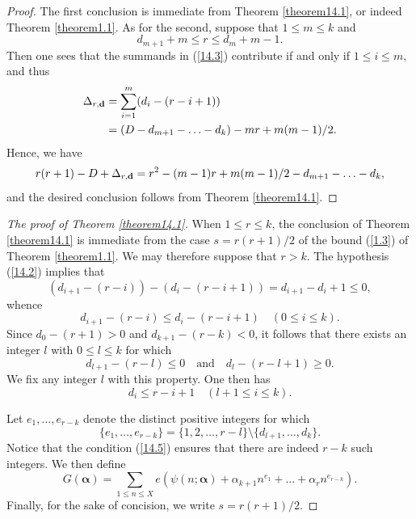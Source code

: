 \documentclass[12pt,reqno]{amsart}
\theoremstyle{definition}
\theoremstyle{remark}
\numberwithin{equation}{section}
\def\bfd{{\mathbf d}} \def\bfe{{\mathbf e}} \def\bff{{\mathbf f}}
\def\alp{{\alpha}} \def\bfalp{{\boldsymbol \alpha}}
\def\le{\leqslant} \def\ge{\geqslant} \def\pleq{\preccurlyeq} \def\ple{\prec}
\begin{document}
\begin{proof} The first conclusion is immediate from Theorem \ref{theorem14.1}, or 
indeed Theorem \ref{theorem1.1}. As for the second, suppose that $1\le m\le k$ and
$$d_{m+1}+m\le r\le d_m+m-1.$$
Then one sees that the summands in (\ref{14.3}) contribute if and only if $1\le i\le m$, and 
thus
\begin{align*}
\Del_{r,\bfd}&=\sum_{i=1}^m(d_i-(r-i+1))\\
&=(D-d_{m+1}-\ldots -d_k)-mr+m(m-1)/2.
\end{align*}
Hence, we have
$$r(r+1)-D+\Del_{r,\bfd}=r^2-(m-1)r+m(m-1)/2-d_{m+1}-\ldots -d_k,$$
and the desired conclusion follows from Theorem \ref{theorem14.1}.
\end{proof}

\begin{proof}[The proof of Theorem \ref{theorem14.1}] When $1\le r\le k$, the conclusion 
of Theorem \ref{theorem14.1} is immediate from the case $s=r(r+1)/2$ of the bound 
(\ref{1.3}) of Theorem \ref{theorem1.1}. We may therefore suppose that $r>k$. The 
hypothesis (\ref{14.2}) implies that
$$(d_{i+1}-(r-i))-(d_i-(r-i+1))=d_{i+1}-d_i+1\le 0,$$
whence
$$d_{i+1}-(r-i)\le d_i-(r-i+1)\quad (0\le i\le k).$$
Since $d_0-(r+1)>0$ and $d_{k+1}-(r-k)<0$, it follows that there exists an integer $l$ with 
$0\le l\le k$ for which
$$d_{l+1}-(r-l)\le 0\quad \text{and}\quad d_l-(r-l+1)\ge 0.$$
We fix any integer $l$ with this property. One then has
\begin{equation}\label{14.5}
d_i\le r-i+1\quad (l+1\le i\le k).
\end{equation}

Let $e_1,\ldots ,e_{r-k}$ denote the distinct positive integers for which
$$\{e_1,\ldots ,e_{r-k}\}=\{1,2,\ldots ,r-l\}\setminus \{d_{l+1},\ldots ,d_k\}.$$
Notice that the condition (\ref{14.5}) ensures that there are indeed $r-k$ such integers. 
We then define
$$G(\bfalp)=\sum_{1\le n\le X}e(\psi(n;\bfalp)+\alp_{k+1}n^{e_1}+\ldots 
+\alp_rn^{e_{r-k}}).$$
Finally, for the sake of concision, we write $s=r(r+1)/2$.\par


\end{proof}
\end{document}
